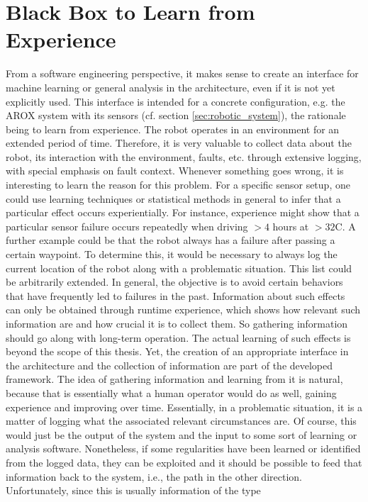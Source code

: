 \documentclass[english, master, utf8]{base/thesis_KBS}
\begin{document}
\section{Black Box to Learn from Experience}
\label{sec:black_box}

From a software engineering perspective, it makes sense to create an interface for machine learning or general analysis in the architecture, even if it is not yet explicitly used.
This interface is intended for a concrete configuration, e.g. the AROX system with its sensors (cf. section \ref{sec:robotic_system}), the rationale being to learn from experience. The robot operates in an environment for an
extended period of time. Therefore, it is very valuable to collect data about the robot, its interaction with the environment, faults, etc. through extensive logging, with special
emphasis on fault context. Whenever something goes wrong, it is interesting to learn the reason for this problem. For a specific sensor setup, one could use learning techniques or
statistical methods in general to infer that a particular effect occurs experientially. For instance, experience might show that a particular sensor failure occurs repeatedly when driving $> 4$ hours at
$> 32$\textdegree{}C. A further example could be that the robot always has a failure after passing a certain waypoint. To determine this, it would be necessary to always
log the current location of the robot along with a problematic situation. This list could be arbitrarily extended.
In general, the objective is to avoid certain behaviors that have frequently led to failures in the past. Information about such effects can only be
obtained through runtime experience, which shows how relevant such information are and how crucial it is to collect them. So gathering information should go along with long-term
operation. The actual learning of such effects is beyond the scope of this thesis. Yet, the creation of an appropriate interface in the architecture and the collection of information
are part of the developed framework. The idea of gathering information and learning from it is natural, because that is essentially what a human operator would do as well, gaining
experience and improving over time. Essentially, in a problematic situation, it is a matter of logging what the associated relevant circumstances are. Of course, this would just be
the output of the system and the input to some sort of learning or analysis software. Nonetheless, if some regularities have been learned or identified from the logged data, they can
be exploited and it should be possible to feed that information back to the system, i.e., the path in the other direction. Unfortunately, since this is usually information of the type
\end{document}
